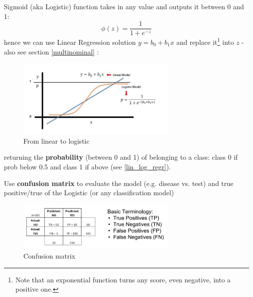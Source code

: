 \documentclass[11pt]{article}
\begin{document}
Sigmoid (aka Logistic) function takes in any value and outputs it between 0 and 1:
\[ \phi(z) = \frac{1}{1+e^{-z}}
\]
hence we can use Linear Regression solution $y=b_0+b_1 x$ and replace it\footnote{Note that an exponential function turns any score, even negative, into a positive one.} into $z$ - also see section \ref{multinominal} : 
\begin{figure}[htbp] 
	\centering
	\includegraphics[width=0.7\textwidth]{pics/sigmoid}
	\caption{From linear to logistic}  
	\label{sigmoid}
\end{figure}

returning the \textbf{probability} (between 0 and 1) of belonging to a class: class 0 if prob below 0.5 and class 1 if above (see \ref{lin_log_regr}). 

Use \textbf{confusion matrix} to evaluate the model (e.g. disease vs. test) and true positive/true of the Logistic (or any classification model)
\begin{figure}[htbp] 
	\centering
	\includegraphics[width=0.7\textwidth]{pics/confusion_matrix}
	\caption{Confusion matrix}  
\end{figure}
\end{document}
